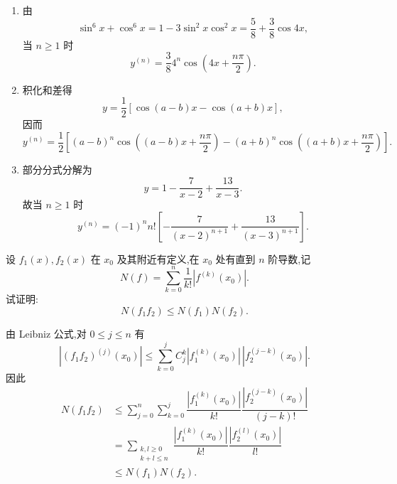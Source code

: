 \begin{solution}
    \leavevmode
    \begin{enumerate}
        \item 由
              \[
                  \sin^6x+\cos^6x
                  =1-3\sin^2x\cos^2x
                  =\dfrac{5}{8}+\dfrac{3}{8}\cos4x,
              \]
              当 $n\geq1$ 时
              \[
                  y^{(n)}=\dfrac{3}{8}4^n
                  \cos\left(4x+\dfrac{n\pi}{2}\right).
              \]
        \item 积化和差得
              \[
                  y=\dfrac{1}{2}\left[\cos(a-b)x-\cos(a+b)x\right],
              \]
              因而
              \[
                  y^{(n)}=\dfrac{1}{2}\left[
                      (a-b)^n\cos\left((a-b)x+\dfrac{n\pi}{2}\right)
                      -(a+b)^n\cos\left((a+b)x+\dfrac{n\pi}{2}\right)
                      \right].
              \]
        \item 部分分式分解为
              \[
                  y=1-\dfrac{7}{x-2}+\dfrac{13}{x-3}.
              \]
              故当 $n\geq1$ 时
              \[
                  y^{(n)}=(-1)^n n!\left[
                      -\dfrac{7}{(x-2)^{n+1}}+\dfrac{13}{(x-3)^{n+1}}
                      \right].
              \]
    \end{enumerate}
\end{solution}




\begin{example}
    设 $f_1(x),f_2(x)$ 在 $x_0$ 及其附近有定义,在 $x_0$ 处有直到 $n$ 阶导数,记
    \[
        N(f)=\sum\limits_{k=0}^n\dfrac{1}{k!}|f^{(k)}(x_0)|.
    \]
    试证明:
    \[
        N(f_1f_2)\leq N(f_1)N(f_2).
    \]
\end{example}
\exampleblank

\begin{solution}
    由 Leibniz 公式,对 $0\leq j\leq n$ 有
    \[
        |(f_1f_2)^{(j)}(x_0)|
        \leq\sum\limits_{k=0}^{j}C_{j}^{k}
        |f_1^{(k)}(x_0)|\,|f_2^{(j-k)}(x_0)|.
    \]
    因此
    \[
        \begin{aligned}
            N(f_1f_2)
             & \leq\sum\limits_{j=0}^{n}\sum\limits_{k=0}^{j}
            \dfrac{|f_1^{(k)}(x_0)|}{k!}
            \dfrac{|f_2^{(j-k)}(x_0)|}{(j-k)!}                \\
             & =\sum\limits_{\substack{k,l\geq0               \\k+l\leq n}}
            \dfrac{|f_1^{(k)}(x_0)|}{k!}
            \dfrac{|f_2^{(l)}(x_0)|}{l!}                      \\
             & \leq N(f_1)N(f_2).
        \end{aligned}
    \]
\end{solution}

